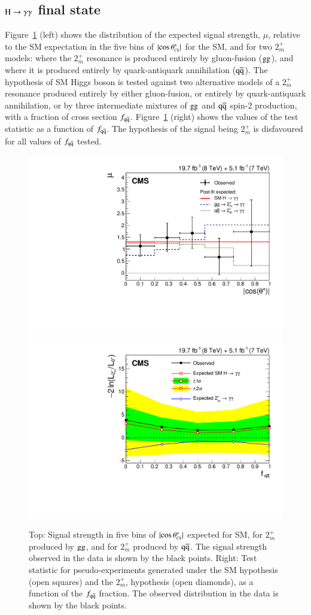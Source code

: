 \subsection{$\mathrm{H}\to\gamma\gamma$ final state}
\label{sec:exotic_hgg}

Figure~\ref{fig:hgg_spin2} (left) shows the distribution of the
expected signal strength, $\mu$, relative to the SM expectation in the
five bins of $|{\cos\theta^{\ast}_{\mbox{\tiny{CS}}}}|$ for the SM, and for two $2_m^+$ models:
where the $2_m^+$ resonance is produced entirely by gluon-fusion
($\mathrm{g}\mathrm{g}$), and where it is produced entirely by quark-antiquark
annihilation ($\mathrm{q}\mathrm{\overline{q}}$).  The hypothesis of SM Higgs boson is
tested against two alternative models of a $2_m^+$ resonance produced
entirely by either gluon-fusion, or entirely by quark-antiquark
annihilation, or by three intermediate mixtures of $\mathrm{g}\mathrm{g}$ and
$\mathrm{q}\mathrm{\overline{q}}$ spin-2 production, with a fraction of cross section
$f_{\mathrm{\mathrm{q}\mathrm{\overline{q}}}}$. Figure~\ref{fig:hgg_spin2} (right) shows the values of
the test statistic as a function of $f_{\mathrm{\mathrm{q}\mathrm{\overline{q}}}}$.  The hypothesis of the
signal being $2_m^+$ is disfavoured for all values of $f_{\mathrm{\mathrm{q}\mathrm{\overline{q}}}}$
tested.


\begin{figure}[hbtp]
  \begin{center}
    \includegraphics[width=0.49\linewidth]{figures/hgg_mucosth.pdf}
    \includegraphics[width=0.49\linewidth]{figures/hgg_spin2_excl.pdf}
    \caption{Top: Signal strength in five bins of $|{\cos\theta^{\ast}_{\mbox{\tiny{CS}}}}|$ expected for SM, for $2^+_m$ produced
      by $\mathrm{g}\mathrm{g}$, and for $2^+_m$ produced by $\mathrm{\mathrm{q}\mathrm{\overline{q}}}$.
      The signal strength observed in the data is shown by the black points.
      Right: Test statistic for pseudo-experiments generated under the SM hypothesis (open squares) and the
$2^+_m$, hypothesis (open diamonds), as a function of the $f_{\mathrm{\mathrm{q}\mathrm{\overline{q}}}}$ fraction.
      The observed distribution in the data is shown by the black points.
      \label{fig:hgg_spin2}
    }
  \end{center}
\end{figure}



